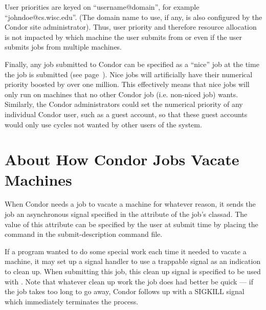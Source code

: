 User priorities are keyed on ``username@domain'', for example
``johndoe@cs.wisc.edu''. (The domain name to use, if any, is also configured by
the Condor site administrator).  Thus, user priority and therefore resource
allocation is not impacted by which machine the user submits from or
even if the user submits jobs from multiple machines.

Finally, any job submitted to Condor can be specified as a ``nice'' job at 
the time the job is submitted (see page~\pageref{man-condor-submit-nice}).
Nice jobs will artificially have their numerical priority boosted by
over one million. This effectively means that nice jobs will only run on
machines that no other Condor job (i.e. non-niced job) wants. Similarly,
the Condor administrators could set the numerical priority of any
individual Condor user, such as a guest account, so that these guest
accounts would only use cycles not wanted by other users of the system.







\section{\label{sec:Vacate-Explained}
About How Condor Jobs Vacate Machines}

When Condor needs a job to vacate a machine for whatever reason, it
sends the job an asynchronous signal specified in the 
attribute of the job's classad.
The value of this attribute can be specified by
the user at submit time by placing the  command in the
 submit-description command file.  

If a program wanted to do some special work each time
it needed to vacate a machine, it may set up a
signal handler to use a trappable signal as an indication
to clean up.
When submitting this job, this clean up signal is specified to be used with
.
Note that whatever clean up work the job does had better be quick
--- if the job takes too long to go away, Condor
follows up with a SIGKILL signal which immediately terminates the
process.

